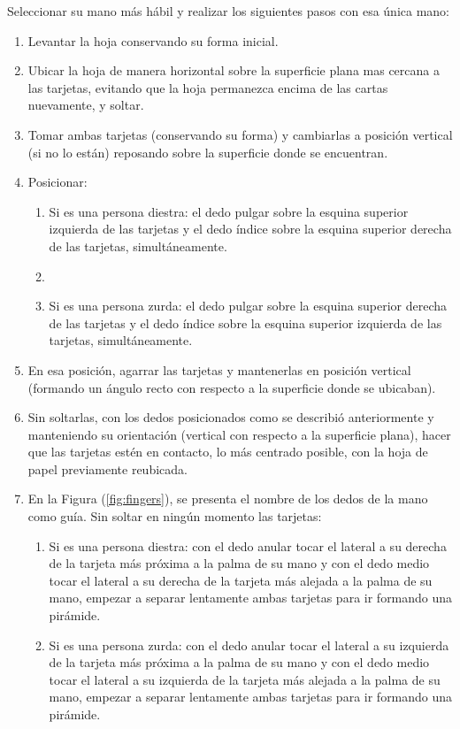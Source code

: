 \documentclass{article}
\begin{document}
Seleccionar su mano más hábil y realizar los siguientes pasos con esa única mano:
\begin{enumerate}

    \item Levantar la hoja conservando su forma inicial.
    \item Ubicar la hoja de manera horizontal sobre la superficie plana mas cercana a las tarjetas, evitando que la hoja permanezca encima de las cartas nuevamente, y soltar.
    \item Tomar ambas tarjetas (conservando su forma) y cambiarlas a posición vertical (si no lo están) reposando sobre la superficie donde se encuentran.
    \item Posicionar:
    
    \begin{enumerate}
    
        \item Si es una persona diestra: el dedo pulgar sobre la esquina superior izquierda de las tarjetas y el dedo índice sobre la esquina superior derecha de las tarjetas, simultáneamente.
        \item \item Si es una persona zurda: el dedo pulgar sobre la esquina superior derecha de las tarjetas y el dedo índice sobre la esquina superior izquierda de las tarjetas, simultáneamente.
        
    \end{enumerate}
    
    \item En esa posición, agarrar las tarjetas y mantenerlas en posición vertical (formando un ángulo recto con respecto a la superficie donde se ubicaban).
    \item Sin soltarlas, con los dedos posicionados como se describió anteriormente y manteniendo su orientación (vertical con respecto a la superficie plana), hacer que las tarjetas estén en contacto, lo más centrado posible, con la hoja de papel previamente reubicada.
    \item En la Figura (\ref{fig:fingers}), se presenta el nombre de los dedos de la mano como guía. Sin soltar en ningún momento las tarjetas:
    
    \begin{enumerate}
    
        \item Si es una persona diestra: con el dedo anular tocar el lateral a su derecha de la tarjeta más próxima a la palma de su mano y con el dedo medio tocar el lateral a su derecha de la tarjeta más alejada a la palma de su mano, empezar a separar lentamente ambas tarjetas para ir formando una pirámide.
        \item Si es una persona zurda: con el dedo anular tocar el lateral a su izquierda de la tarjeta más próxima a la palma de su mano y con el dedo medio tocar el lateral a su izquierda de la tarjeta más alejada a la palma de su mano, empezar a separar lentamente ambas tarjetas para ir formando una pirámide. 
        

\end{enumerate}
\end{enumerate}
\end{document}
